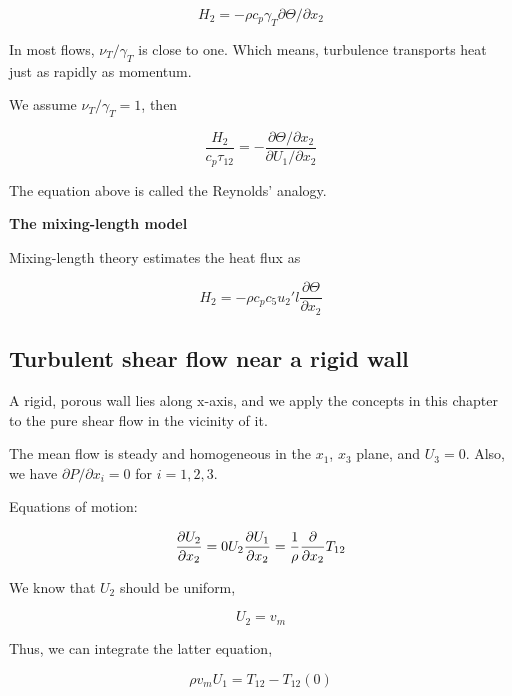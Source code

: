\documentclass{article}
\begin{document}
\begin{equation*}
    H_2=-\rho c_p \gamma_T \partial \Theta/\partial x_2
\end{equation*}

In most flows, $\nu_T/\gamma_T$ is close to one. Which means, turbulence transports heat just as rapidly as momentum.

We assume $\nu_T/\gamma_T=1$, then

\begin{equation*}
    \frac{H_2}{c_p\tau_{12}}=-\frac{\partial \Theta /\partial x_2}{\partial U_1/\partial x_2}
\end{equation*}

The equation above is called the Reynolds' analogy.

\textbf{The mixing-length model}

Mixing-length theory estimates the heat flux as

\begin{equation*}
    H_2=-\rho c_p c_5 u_2' l \frac{\partial \Theta}{\partial x_2}
\end{equation*}

\subsection{Turbulent shear flow near a rigid wall}

A rigid, porous wall lies along x-axis, and we apply the concepts in this chapter to the pure shear flow in the vicinity of it.

The mean flow is steady and homogeneous in the $x_1$, $x_3$ plane, and $U_3=0$. Also, we have $\partial P/\partial x_i=0$ for $i=1,2,3$.

Equations of motion:

\begin{equation*}
    \frac{\partial U_2}{\partial x_2}=0\\
    U_2\frac{\partial U_1}{\partial x_2}=\frac{1}{\rho}\frac{\partial}{\partial x_2}T_{12}
\end{equation*}

We know that $U_2$ should be uniform,

\begin{equation*}
    U_2=v_m
\end{equation*}

Thus, we can integrate the latter equation,

\begin{equation*}
    \rho v_m U_1=T_{12}-T_{12}(0)
\end{equation*}
\end{document}
